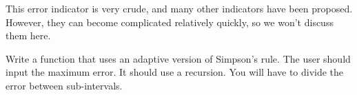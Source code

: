 This error indicator is very crude, and many other indicators have been proposed.
However, they can become complicated relatively quickly, so we won't discuss them here. 

\begin{problem}
Write a function that uses an adaptive version of Simpson's rule.
The user should input the maximum error.
It should use a recursion.
You will have to divide the error between sub-intervals.

\end{problem}
